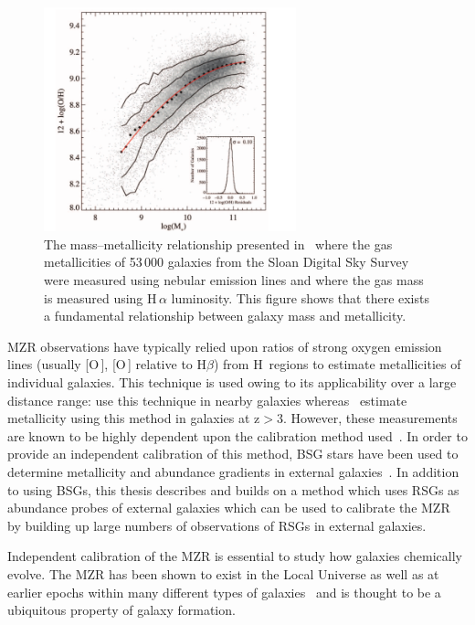 \begin{figure}
 \centering
 \includegraphics[width=0.65\textwidth]{intro/MZR}
 \caption[\citeauthor{Tremonti04} mass--metallicity relationship]{The mass--metallicity relationship presented in~\citep{Tremonti04} where the gas metallicities of 53\,000 galaxies from the Sloan Digital Sky Survey were measured using nebular emission lines and where the gas mass is measured using H\,$\alpha$ luminosity.
 This figure shows that there exists a fundamental relationship between galaxy mass and metallicity.
 \label{fig:MZR}}
\end{figure}

MZR observations have typically relied upon ratios of strong oxygen emission lines (usually [O\,\2], [O\,\3] relative to H$\beta$) from H\,\2 regions to estimate metallicities of individual galaxies.
This technique is used owing to its applicability over a large distance range:
\cite{2001MNRAS.323..887C} use this technique in nearby galaxies whereas~\cite{Maiolino08} estimate metallicity using this method in galaxies at z$>$3.
However, these measurements are known to be highly dependent upon the calibration method used~\citep{Kewley08,2008ApJ...681..269K,Bresolin09}.
In order to provide an independent calibration of this method, BSG stars have been used to determine metallicity and abundance gradients in external galaxies~\citep{Kudritzki12}.
In addition to using BSGs, this thesis describes and builds on a method which uses RSGs as abundance probes of external galaxies which can be used to calibrate the MZR by building up large numbers of observations of RSGs in external galaxies.

Independent calibration of the MZR is essential to study how galaxies chemically evolve.
The MZR has been shown to exist in the Local Universe as well as at earlier epochs within many different types of galaxies~\citep[e.g.][]{2011ApJ...730..137Z,2013ApJ...765..140A,2014MNRAS.440.2300C,2014ApJ...795..165S,2014MNRAS.437.3647Y,2015ApJ...799..138S} and is thought to be a ubiquitous property of galaxy formation.

